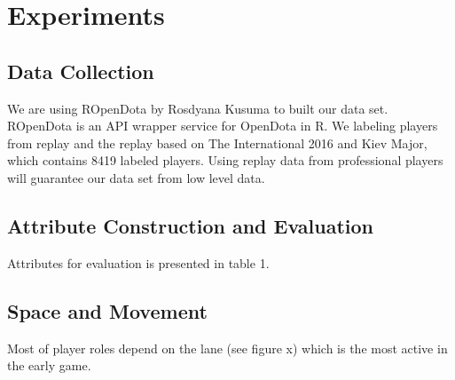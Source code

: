 \section{Experiments}
\label{sec:exp}

\subsection{Data Collection}
\label{sec:datacollection}

We are using ROpenDota by Rosdyana Kusuma to built our data set. ROpenDota is an API wrapper service for OpenDota in R. We labeling players from replay and the replay based on The International 2016 and Kiev Major, which contains 8419 labeled players. Using replay data from professional players will guarantee our data set from low level data.

\subsection{Attribute Construction and Evaluation}
\label{sec:attconsandeval}
Attributes for evaluation is presented in table 1. 

\subsection{Space and Movement}
\label{spaceandmovement}
Most of player roles depend on the lane (see figure x) which is the most active in the early game.